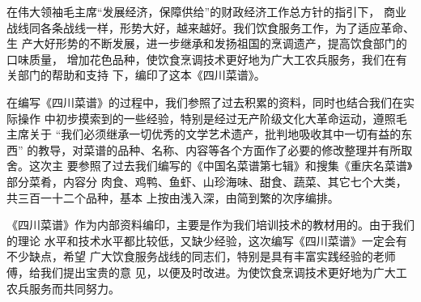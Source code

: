 \enlargethispage{1\baselineskip}%
\begin{center}%
\Large\bfseries%
{}%
\end{center}%

在伟大领袖毛主席{\sffamily“发展经济，保障供给”}的财政经济工作总方针的指引下，
商业战线同各条战线一样，形势大好，越来越好。我们饮食服务工作，为了适应革命、生
产大好形势的不断发展，进一步继承和发扬祖国的烹调遗产，提高饮食部门的口味质量，
增加花色品种，使饮食烹调技术更好地为广大工农兵服务，我们在有关部门的帮助和支持
下，编印了这本《四川菜谱》。

在编写《四川菜谱》的过程中，我们参照了过去积累的资料，同时也结合我们在实际操作
中初步摸索到的一些经验，特别是经过无产阶级文化大革命运动，遵照毛主席关于%
{\sffamily“我们必须继承一切优秀的文学艺术遗产，批判地吸收其中一切有益的东西”}%
的教导，对菜谱的品种、名称、内容等各个方面作了必要的修改整理并有所取舍。这次主
要参照了过去我们编写的《中国名菜谱第七辑》和搜集《重庆名菜谱》部分菜肴，内容分
肉食、鸡鸭、鱼虾、山珍海味、甜食、蔬菜、其它七个大类，共三百一十二个品种，基本
上按由浅入深，由简到繁的次序编排。

《四川菜谱》作为内部资料编印，主要是作为我们培训技术的教材用的。由于我们的理论
水平和技术水平都比较低，又缺少经验，这次编写《四川菜谱》一定会有不少缺点，希望
广大饮食服务战线的同志们，特别是具有丰富实践经验的老师傅，给我们提出宝贵的意
见，以便及时改进。为使饮食烹调技术更好地为广大工农兵服务而共同努力。

\vspace{-.335823\baselineskip}
\begin{flushright}
\end{flushright}

